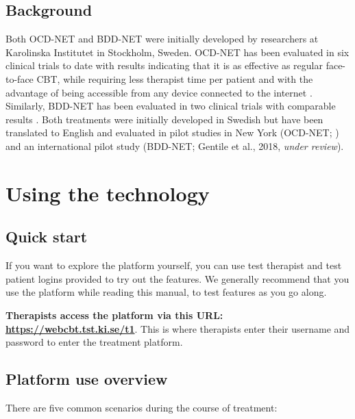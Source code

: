 \documentclass[]{book}
\theoremstyle{definition}
\theoremstyle{definition}
\theoremstyle{definition}
\theoremstyle{remark}
\begin{document}
\hypertarget{background}{%
\section{Background}\label{background}}

Both OCD-NET and BDD-NET were initially developed by researchers at
Karolinska Institutet in Stockholm, Sweden. OCD-NET has been evaluated
in six clinical trials to date with results indicating that it is as
effective as regular face-to-face CBT, while requiring less therapist
time per patient and with the advantage of being accessible from any
device connected to the internet
\citep{andersson2011a, andersson2012, andersson2014a, andersson2015a, ruck2018}.
Similarly, BDD-NET has been evaluated in two clinical trials with
comparable results \citep{enander2014, enander2016}. Both treatments
were initially developed in Swedish but have been translated to English
and evaluated in pilot studies in New York (OCD-NET; \citet{patel2017})
and an international pilot study (BDD-NET; Gentile et al., 2018,
\emph{under review}).

\hypertarget{using-the-technology}{%
\chapter{Using the technology}\label{using-the-technology}}

\hypertarget{quick-start}{%
\section{Quick start}\label{quick-start}}

If you want to explore the platform yourself, you can use test therapist
and test patient logins provided to try out the features. We generally
recommend that you use the platform while reading this manual, to test
features as you go along.

\textbf{Therapists access the platform via this URL:
\url{https://webcbt.tst.ki.se/t1}}. This is where therapists enter their
username and password to enter the treatment platform.

\hypertarget{platform-use-overview}{%
\section{Platform use overview}\label{platform-use-overview}}

There are five common scenarios during the course of treatment:
\end{document}
